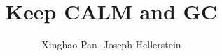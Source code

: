\documentclass{sig-alternate-10}
\title{Keep CALM and GC}
\author{Xinghao Pan, Joseph Hellerstein}
\numberwithin{equation}{section}
\begin{document}
\maketitle




























\balancecolumns


\newpage\onecolumn
\appendix






\end{document}
